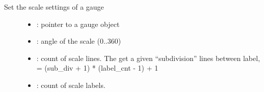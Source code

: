 \documentclass[letterpaper,10pt,english]{sphinxmanual}
\begin{document}
\begin{fulllineitems}
\label{\detokenize{object-types/gauge:_CPPv418lv_gauge_set_scaleP8lv_obj_t8uint16_t7uint8_t7uint8_t}}%
\pysigstartmultiline
{}\label{\detokenize{object-types/gauge:lv__gauge_8h_1a506ad941aa065ab66f8a530b275c9621}}%
\pysigstopmultiline
Set the scale settings of a gauge \begin{description}
\item[{}] \leavevmode\begin{itemize}
\item {} 
: pointer to a gauge object 

\item {} 
: angle of the scale (0..360) 

\item {} 
: count of scale lines. The get a given “subdivision” lines between label,  = (sub\_div + 1) * (label\_cnt - 1) + 1 

\item {} 
: count of scale labels. 

\end{itemize}

\end{description}


\end{fulllineitems}

\end{document}
